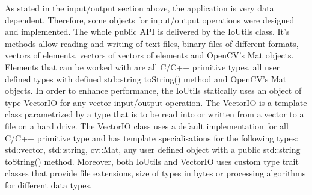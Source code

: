 		As stated in the input/output section above, the application is very data dependent. Therefore, some objects for input/output operations were designed and implemented. The whole public API is delivered by the IoUtils class. It's methods allow reading and writing of text files, binary files of different formats, vectors of elements, vectors of vectors of elements and OpenCV's Mat objects. Elements that can be worked with are all C/C++ primitive types, all user defined types with defined std::string toString() method and OpenCV's Mat objects. In order to enhance performance, the IoUtils statically uses an object of type VectorIO for any vector input/output operation. The VectorIO is a template class parametrized by a type that is to be read into or written from a vector to a file on a hard drive. The VectorIO class uses a default implementation for all C/C++ primitive type and has template specialisations for the following types: std::vector, std::string, cv::Mat, any user defined object with a public std::string toString() method. Moreover, both IoUtils and VectorIO uses custom type trait classes that provide file extensions, size of types in bytes or processing algorithms for different data types.
		
		




